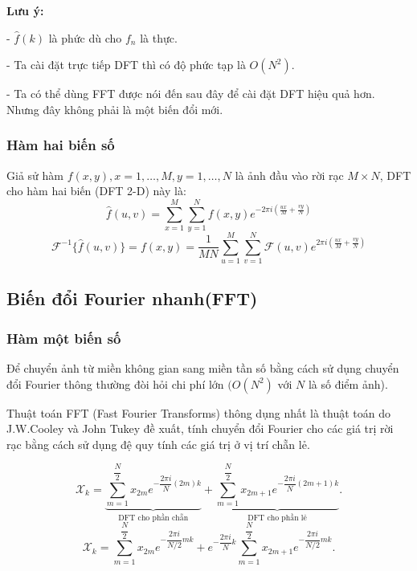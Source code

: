 \documentclass[12pt,a4paper]{report}
\numberwithin{equation}{section}
\theoremstyle{definition} %
\begin{document}
\textbf{Lưu ý:}

- $\hat{f}(k)$ là phức dù cho $f_n$ là thực.

- Ta cài đặt trực tiếp DFT thì có độ phức tạp là $O(N^2)$.

- Ta có thể dùng FFT được nói đến sau đây để cài đặt DFT hiệu quả hơn. Nhưng đây không phải là một biến đổi mới.

\subsubsection{Hàm hai biến số}
Giả sử hàm $f(x,y),x = 1,\ldots,M, y = 1,\ldots,N$ là ảnh đầu vào rời rạc $M\times N$, DFT cho hàm hai biến (DFT 2-D) này là: 
\begin{equation}
\hat{f}(u,v) = \sum_{x=1}^{M}\sum_{y=1}^{N} f(x,y)e^{-2\pi i\left(\frac{ux}{M}+\frac{vy}{N}\right)}
\end{equation}
\begin{equation}
\mathcal{F}^{-1}\{\hat{f}(u,v)\}=f(x,y) =\dfrac{1}{MN}\sum_{u=1}^{M}\sum_{v=1}^{N} \mathcal{F}(u,v)e^{2\pi i\left(\frac{ux}{M}+\frac{vy}{N}\right)}
\end{equation}

\subsection{Biến đổi Fourier nhanh(FFT)}
\subsubsection{Hàm một biến số}
Để chuyển ảnh từ miền không gian sang miền tần số bằng cách sử dụng chuyển đổi Fourier thông thường đòi hỏi chi phí lớn $(O(N^2)$ với $N$ là số điểm ảnh).

Thuật toán FFT (Fast Fourier Transforms) thông dụng nhất là thuật toán do J.W.Cooley và John Tukey đề xuất, tính chuyển đổi Fourier cho các giá trị rời rạc bằng cách sử dụng đệ quy tính các giá trị ở vị trí chẵn lẻ. 


\begin{equation}
	\label{1314}
\mathcal{X}_k = \underbrace{\sum_{m=1}^{\dfrac{N}{2}}x_{2m}e^{-\dfrac{2\pi i}{N}(2m)k}}_{ \text{DFT cho phần chẵn}} + \underbrace{\sum_{m=1}^{\dfrac{N}{2}}x_{2m+1}e^{-\dfrac{2\pi i}{N}(2m+1)k}}_{\text{DFT cho phần lẻ}}.
\end{equation}
\begin{equation}
	\label{1315}
\mathcal{X}_k = \sum_{m=1}^{\dfrac{N}{2}}x_{2m}e^{-\dfrac{2\pi i}{N/2}mk} + e^{-\dfrac{2\pi i }{N}k}\sum_{m=1}^{\dfrac{N}{2}}x_{2m+1}e^{-\dfrac{2\pi i}{N/2}mk}.
\end{equation}
\end{document}
